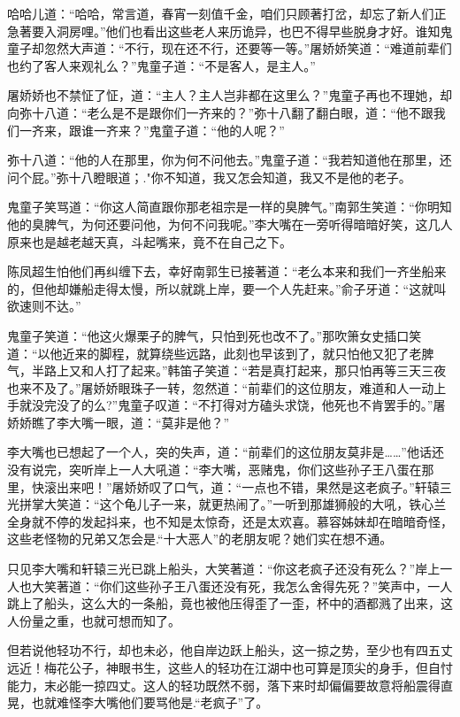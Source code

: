 \documentclass[12pt,oneside]{book}
\begin{document}
哈哈儿道：``哈哈，常言道，春宵一刻值千金，咱们只顾著打岔，却忘了新人们正急著要入洞房哩。''他们也看出这些老人来历诡异，也巴不得早些脱身才好。谁知鬼童子却忽然大声道：``不行，现在还不行，还要等一等。''屠娇娇笑道：``难道前辈们也约了客人来观礼么？''鬼童子道：``不是客人，是主人。''

屠娇娇也不禁怔了怔，道：``主人？主人岂非都在这里么？''鬼童子再也不理她，却向弥十八道：``老么是不是跟你们一齐来的？''弥十八翻了翻白眼，道：``他不跟我们一齐来，跟谁一齐来？''鬼童子道：``他的人呢？''

弥十八道：``他的人在那里，你为何不问他去。''鬼童子道：``我若知道他在那里，还问个屁。''弥十八瞪眼道；."你不知道，我又怎会知道，我又不是他的老子。

鬼童子笑骂道：``你这人简直跟你那老祖宗是一样的臭脾气。''南郭生笑道：``你明知他的臭脾气，为何还要问他，为何不问我呢。''李大嘴在一旁听得暗暗好笑，这几人原来也是越老越天真，斗起嘴来，竟不在自己之下。

陈凤超生怕他们再纠缠下去，幸好南郭生已接著道：``老么本来和我们一齐坐船来的，但他却嫌船走得太慢，所以就跳上岸，要一个人先赶来。''俞子牙道：``这就叫欲速则不达。''

鬼童子笑道：``他这火爆栗子的脾气，只怕到死也改不了。''那吹箫女史插口笑道：``以他近来的脚程，就算绕些远路，此刻也早该到了，就只怕他又犯了老脾气，半路上又和人打了起来。''韩笛子笑道：``若是真打起来，那只怕再等三天三夜也来不及了。''屠娇娇眼珠子一转，忽然道：``前辈们的这位朋友，难道和人一动上手就没完没了的么?''鬼童子叹道：``不打得对方磕头求饶，他死也不肯罢手的。''屠娇娇瞧了李大嘴一眼，道：``莫非是他？''

李大嘴也已想起了一个人，突的失声，道：``前辈们的这位朋友莫非是\ldots\ldots{}''他话还没有说完，突听岸上一人大吼道：``李大嘴，恶赌鬼，你们这些孙子王八蛋在那里，快滚出来吧！''屠娇娇叹了口气，道：``一点也不错，果然是这老疯子。''轩辕三光拼掌大笑道：``这个龟儿子一来，就更热闹了。''一听到那雄狮般的大吼，铁心兰全身就不停的发起抖来，也不知是太惊奇，还是太欢喜。慕容姊妹却在暗暗奇怪，这些老怪物的兄弟又怎会是.``十大恶人''的老朋友呢？她们实在想不通。

只见李大嘴和轩辕三光已跳上船头，大笑著道：``你这老疯子还没有死么？''岸上一人也大笑著道：``你们这些孙子王八蛋还没有死，我怎么舍得先死？''笑声中，一人跳上了船头，这么大的一条船，竟也被他压得歪了一歪，杯中的酒都溅了出来，这人份量之重，也就可想而知了。

但若说他轻功不行，却也未必，他自岸边跃上船头，这一掠之势，至少也有四五丈远近！梅花公子，神眼书生，这些人的轻功在江湖中也可算是顶尖的身手，但自忖能力，末必能一掠四丈。这人的轻功既然不弱，落下来时却偏偏要故意将船震得直晃，也就难怪李大嘴他们要骂他是.``老疯子''了。
\end{document}
